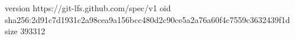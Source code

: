 version https://git-lfs.github.com/spec/v1
oid sha256:2d91c7d1931c2a98cea9a156bcc480d2c90ce5a2a76a60f4c7559c3632439f1d
size 393312
